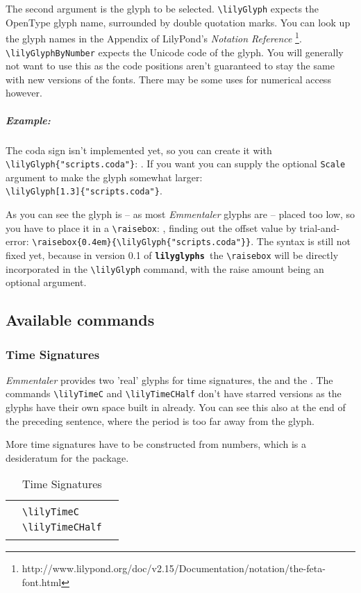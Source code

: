 \documentclass{article}
\newcommand{\lilyglyphs}{\texttt{\textbf{lilyglyphs }}}
\newcommand*{\cmd}[1]{\texttt{\textbackslash #1}}
\newcommand{\tmpCaption}{} %
\newcommand{\tmpLabel}{}
\newenvironment{reftable}[2]
	{%
		\renewcommand{\tmpCaption}{#1}
		\renewcommand{\tmpLabel}{#2}
		\begin{table}[ht]
		\begin{center}
		\begin{tabular}[t]{lll}
		\hline
		&\\
	}
	{%
		&\\
		\hline
		\end{tabular}
		\caption{\tmpCaption}
		\label{table:\tmpLabel}
		\end{center}
		\end{table}
	}
\begin{document}
The second argument is the glyph to be selected. \cmd{lilyGlyph} expects the OpenType glyph name, surrounded by double quotation marks. You can look up the glyph names in the Appendix of LilyPond's \emph{Notation Reference} \footnote{http://www.lilypond.org/doc/v2.15/Documentation/notation/the-feta-font.html}. \cmd{lilyGlyphByNumber} expects the Unicode code of the glyph. You will generally not want to use this as the code positions aren't guaranteed to stay the same with new versions of the fonts. There may be some uses for numerical access however.

\subparagraph*{Example:}
The coda sign isn't implemented yet, so you can create it with \cmd{lilyGlyph\{"scripts.coda"\}}: . If you want you can supply the optional \texttt{Scale} argument to make the glyph somewhat larger: ~\\
\cmd{lilyGlyph[1.3]\{"scripts.coda"\}}.

As you can see the glyph is -- as most \emph{Emmentaler} glyphs are -- placed too low, so you have to place it in a  \cmd{raisebox}: , finding out the offset value by trial-and-error: \cmd{raisebox\{0.4em\}\{\textbackslash lilyGlyph\{"scripts.coda"\}\}}. The syntax is still not fixed yet, because in version 0.1 of \lilyglyphs the \cmd{raisebox} will be directly incorporated in the \cmd{lilyGlyph} command, with the raise amount being an optional argument.


\subsection{Available commands}

\subsubsection{Time Signatures}
\emph{Emmentaler} provides two 'real' glyphs for time signatures, the \lilyTimeC and the \lilyTimeCHalf. The commands \cmd{lilyTimeC} and \cmd{lilyTimeCHalf} don't have starred versions as the glyphs have their own space built in already. You can see this also at the end of the preceding sentence, where the period is too far away from the glyph.

More time signatures have to be constructed from numbers, which is a desideratum for the package.

\begin{reftable}{Time Signatures}{timesignatures}
\lilyTimeC & \cmd{lilyTimeC}\\
\lilyTimeCHalf & \cmd{lilyTimeCHalf}\\
\end{reftable}
\end{document}
